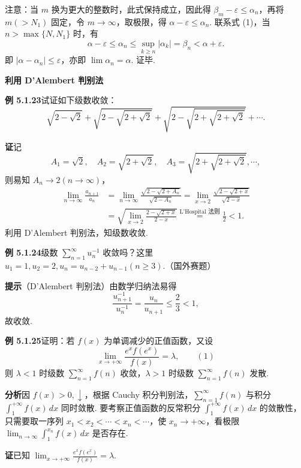\documentclass[UTF8,12pt,a4paper,fontset=fandol]{ctexart}
\begin{document}
注意：当 $m$ 换为更大的整数时，此式保持成立，因此得 $\beta_m-\varepsilon\le\alpha_n$，再将 $m(>N_1)$ 固定，令 $m\to\infty$，取极限，得 $\alpha-\varepsilon\le\alpha_n$. 联系式 (1)，当 $n>\max\{N,N_1\}$ 时，有
\[
  \alpha-\varepsilon\le\alpha_n\le\sup_{k\ge n}|\alpha_k|=\beta_n<\alpha+\varepsilon.
\]
即 $|\alpha-\alpha_n|\le\varepsilon$，亦即 $\lim\alpha_n=\alpha$. 证毕.

\noindent\textbf{利用 D'Alembert 判别法}

\noindent\textbf{例 5.1.23}\quad 试证如下级数收敛：
\[
  \sqrt{2-\sqrt2}+\sqrt{2-\sqrt{2+\sqrt2}}
  +\sqrt{2-\sqrt{2+\sqrt{2+\sqrt2}}}+\cdots.
\]

\noindent\textbf{证}\quad 记
\[
  A_1=\sqrt2,\quad A_2=\sqrt{2+\sqrt2},\quad
  A_3=\sqrt{2+\sqrt{2+\sqrt2}},\cdots,
\]
则易知 $A_n\to2(n\to\infty)$，
\[
\begin{aligned}
\lim_{n\to\infty}\frac{a_{n+1}}{a_n}
&=\lim_{n\to\infty}
\frac{\sqrt{2-\sqrt{2+A_n}}}{\sqrt{2-A_n}}
=\lim_{x\to2}\frac{\sqrt{2-\sqrt{2+x}}}{\sqrt{2-x}}\\
&=\sqrt{\lim_{x\to2}\frac{2-\sqrt{2+x}}{2-x}}
\stackrel{\text{L'Hospital 法则}}{=}\frac12<1.
\end{aligned}
\]
利用 D'Alembert 判别法，知级数收敛.

\noindent\textbf{例 5.1.24}\quad 级数 $\displaystyle\sum_{n=1}^\infty u_n^{-1}$ 收敛吗？这里 $u_1=1,u_2=2,u_n=u_{n-2}+u_{n-1}(n\ge3)$.（国外赛题）

\noindent\textbf{提示}\quad （D'Alembert 判别法）由数学归纳法易得
\[
  \frac{u_{n+1}^{-1}}{u_n^{-1}}=\frac{u_n}{u_{n+1}}\le\frac23<1,
\]
故收敛.

\noindent\textbf{例 5.1.25}\quad 证明：若 $f(x)$ 为单调减少的正值函数，又设
\[
  \lim_{x\to+\infty}\frac{e^xf(e^x)}{f(x)}=\lambda,
\qquad(1)
\]
则 $\lambda<1$ 时级数 $\displaystyle\sum_{n=1}^\infty f(n)$ 收敛，$\lambda>1$ 时级数 $\displaystyle\sum_{n=1}^\infty f(n)$ 发散.

\noindent\textbf{分析}\quad 因 $f(x)>0,\downarrow$，根据 Cauchy 积分判别法，$\displaystyle\sum_{n=1}^\infty f(n)$ 与积分 $\displaystyle\int_1^{+\infty}f(x)\,dx$ 同时敛散. 要考察正值函数的反常积分 $\displaystyle\int_1^{+\infty}f(x)\,dx$ 的敛散性，只需要取一序列 $x_1<x_2<\cdots<x_n<\cdots$，使 $x_n\to+\infty$，看极限 $\displaystyle\lim_{n\to\infty}\int_1^{x_n}f(x)\,dx$ 是否存在.

\noindent\textbf{证}\quad 已知 $\displaystyle\lim_{x\to+\infty}\frac{e^xf(e^x)}{f(x)}=\lambda$.
\end{document}
